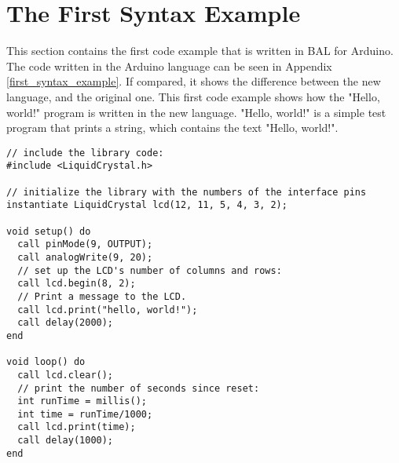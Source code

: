 \section{The First Syntax Example}\label{sec:code_examples}
This section contains the first code example that is written in BAL for Arduino. The code written in the Arduino language can be seen in Appendix \ref{first_syntax_example}. If compared, it shows the difference between the new language, and the original one. This first code example shows how the "Hello, world!" program is written in the new language. "Hello, world!" is a simple test program that prints a string, which contains the text "Hello, world!".
 
\begin{lstlisting}[caption=Hello World code example based on the source language, label=lst:syntax1]
// include the library code:
#include <LiquidCrystal.h>

// initialize the library with the numbers of the interface pins
instantiate LiquidCrystal lcd(12, 11, 5, 4, 3, 2);

void setup() do
  call pinMode(9, OUTPUT);
  call analogWrite(9, 20);
  // set up the LCD's number of columns and rows: 
  call lcd.begin(8, 2);
  // Print a message to the LCD.
  call lcd.print("hello, world!");
  call delay(2000);
end

void loop() do
  call lcd.clear();
  // print the number of seconds since reset:
  int runTime = millis();
  int time = runTime/1000;
  call lcd.print(time);
  call delay(1000);
end
\end{lstlisting}
